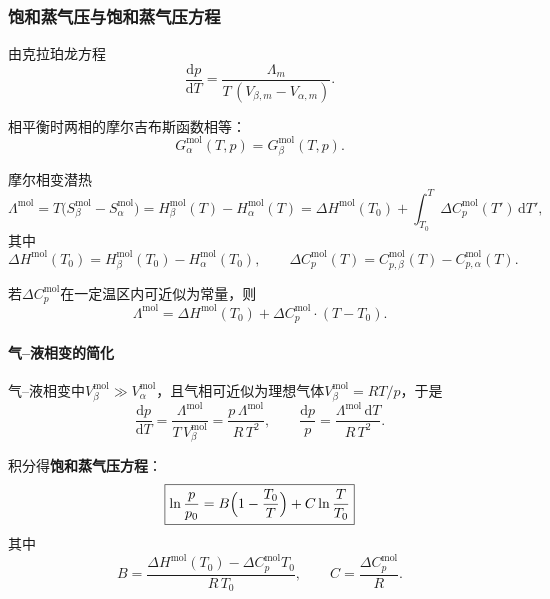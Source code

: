 \documentclass[UTF8]{ctexart}
\theoremstyle{definition}
\begin{document}
\subsubsection*{饱和蒸气压与饱和蒸气压方程}

由克拉珀龙方程
\begin{equation}
\frac{\mathrm{d}p}{\mathrm{d}T}
= \frac{\Lambda_m}{T\,(V_{\beta,m}-V_{\alpha,m})}.
\end{equation}

相平衡时两相的摩尔吉布斯函数相等：
\begin{equation}
G_\alpha^{\mathrm{mol}}(T,p)=G_\beta^{\mathrm{mol}}(T,p).
\end{equation}

摩尔相变潜热
\begin{equation}
\Lambda^{\mathrm{mol}}
= T\bigl(S_\beta^{\mathrm{mol}}-S_\alpha^{\mathrm{mol}}\bigr)
= H_\beta^{\mathrm{mol}}(T)-H_\alpha^{\mathrm{mol}}(T)
= \Delta H^{\mathrm{mol}}(T_0)+\int_{T_0}^{T}\Delta C_p^{\mathrm{mol}}(T')\,\mathrm{d}T',
\end{equation}
其中
\begin{equation}
\Delta H^{\mathrm{mol}}(T_0)=H_\beta^{\mathrm{mol}}(T_0)-H_\alpha^{\mathrm{mol}}(T_0),\qquad
\Delta C_p^{\mathrm{mol}}(T)=C_{p,\beta}^{\mathrm{mol}}(T)-C_{p,\alpha}^{\mathrm{mol}}(T).
\end{equation}

若$\Delta C_p^{\mathrm{mol}}$在一定温区内可近似为常量，则
\begin{equation}
\Lambda^{\mathrm{mol}}
= \Delta H^{\mathrm{mol}}(T_0)+\Delta C_p^{\mathrm{mol}}\cdot(T-T_0).
\end{equation}

\paragraph{气--液相变的简化}

气--液相变中$V_\beta^{\mathrm{mol}}\gg V_\alpha^{\mathrm{mol}}$，且气相可近似为理想气体$V_\beta^{\mathrm{mol}}=RT/p$，于是
\begin{equation}
\frac{\mathrm{d}p}{\mathrm{d}T}
= \frac{\Lambda^{\mathrm{mol}}}{T\,V_\beta^{\mathrm{mol}}}
= \frac{p\,\Lambda^{\mathrm{mol}}}{R\,T^2},
\qquad
\frac{\mathrm{d}p}{p}
= \frac{\Lambda^{\mathrm{mol}}\,\mathrm{d}T}{R\,T^2}.
\end{equation}

积分得\textbf{饱和蒸气压方程}：
\begin{equation}
\boxed{\ln\frac{p}{p_0}
= B\Bigl(1-\frac{T_0}{T}\Bigr)+C\ln\frac{T}{T_0}}
\end{equation}
其中
\begin{equation}
B=\frac{\Delta H^{\mathrm{mol}}(T_0)-\Delta C_p^{\mathrm{mol}}T_0}{R\,T_0},
\qquad
C=\frac{\Delta C_p^{\mathrm{mol}}}{R}.
\end{equation}
\end{document}
